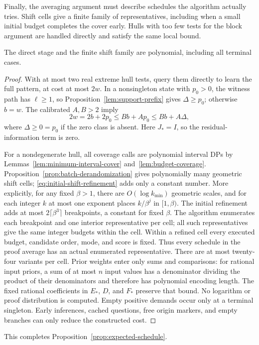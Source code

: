 Finally, the averaging argument must describe schedules the
algorithm actually tries. Shift cells give a finite family of
representatives, including when a small initial budget completes
the cover early. Hulls with too few tests for the block argument
are handled directly and satisfy the same local bound.
\begin{claim}
\label{clm:expected-finite-enumeration}
The direct stage and the finite shift family are polynomial,
including all terminal cases.
\end{claim}
\begin{proof}
With at most two real extreme hull tests, query them directly to
learn the full pattern, at cost at most $2w$. In a nonsingleton state
with $p_0>0$, the witness path has $\ell\ge1$, so
Proposition~\ref{lem:support-prefix} gives $\Delta\ge p_0$;
otherwise $b=w$. The calibrated $A,B>2$ imply
\[
 2w=2b+2p_0\le Bb+Ap_0\le Bb+A\Delta,
\]
where $\Delta\ge0=p_0$ if the zero class is absent. Here $J_*=I$,
so the residual-information term is zero.

For a nondegenerate hull, all coverage calls are polynomial interval
DPs by Lemmas~\ref{lem:minimum-interval-cover}
and~\ref{lem:budget-coverage}. Proposition~\ref{prop:batch-derandomization}
gives polynomially many geometric shift cells;
\eqref{eq:initial-shift-refinement} adds only a constant number.
More explicitly, for any fixed $\beta>1$, there are
$O(\log k_{\min})$ geometric scales, and for each integer $k$ at most
one exponent places $k/\beta^j$ in $[1,\beta)$. The initial
refinement adds at most $2\lceil\beta^3\rceil$ breakpoints, a
constant for fixed $\beta$. The algorithm enumerates each breakpoint
and one interior representative per cell; all such representatives
give the same integer budgets within the cell.
Within a refined cell every executed budget, candidate order, mode,
and score is fixed. Thus every schedule in the proof average has an
actual enumerated representative. There are at most twenty-four
variants per cell. Prior weights enter only sums and comparisons: for
rational input priors, a sum of at most $n$ input values has
a denominator dividing the product of their denominators and
therefore has polynomial encoding length. The fixed rational
coefficients in $E_*$, $D$, and $F_*$ preserve that bound.
No logarithm or proof distribution is computed.
Empty positive demands occur only at a terminal singleton. Early
inferences, cached questions, free origin markers, and empty branches
can only reduce the constructed cost.
\end{proof}
This completes Proposition~\ref{prop:expected-schedule}.

